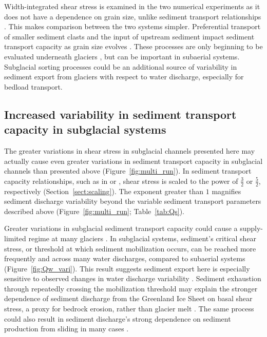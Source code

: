 \documentclass[esurf, manuscript]{copernicus}
\begin{document}
Width-integrated shear stress is examined in the two numerical experiments as it does not have a dependence on grain size, unlike sediment transport relationships \citep[][Section \ref{sect:scaling}]{meyer1948}.
This makes comparison between the two systems simpler. 
Preferential transport of smaller sediment clasts and the input of upstream sediment impact sediment transport capacity as grain size evolves \citep[e.g.][]{gomez1983}.
These processes are only beginning to be evaluated underneath glaciers \citep{aitken2024}, but can be important in subaerial systems.
Subglacial sorting processes could be an additional source of variability in sediment export from glaciers with respect to water discharge, especially for bedload transport.

\subsection{Increased variability in  sediment transport capacity in subglacial systems}
\label{sect:dis_qsc}

The greater variations in shear stress in subglacial channels presented here  may actually cause even greater variations in sediment transport capacity in subglacial channels than presented above  (Figure~\ref{fig:multi_run}).
In sediment transport capacity relationships, such as in \citet{meyer1948} or \citet{engelund1967}, shear stress is scaled to the power of $\frac{3}{2}$ or $\frac{5}{2}$, respectively (Section~\ref{sect:scaling}).
The exponent greater than $1$ magnifies sediment discharge variability beyond the variable sediment transport parameters described above (Figure~\ref{fig:multi_run}; Table~\ref{tab:Qs}).

Greater variations in subglacial sediment transport capacity could cause a supply-limited regime at many glaciers \citep{alley1997}.
In subglacial systems, sediment's critical shear stress, or threshold at which sediment mobilization occurs, can be reached more frequently and across many water discharges, compared to subaerial systems (Figure~\ref{fig:Qw_vari}).
This result suggests sediment export here is especially sensitive to observed changes in water discharge variability \citep{lane2019b}.
Sediment exhaustion through repeatedly crossing the mobilization threshold may explain the stronger dependence of sediment discharge from the Greenland Ice Sheet on basal shear stress, a proxy for bedrock erosion, rather than glacier melt \citep{overeem2017}.
The same process could also result in sediment discharge's strong dependence on sediment production from sliding in many cases \citep{herman2015,koppes2015}.
\end{document}

